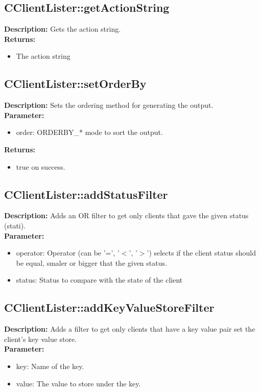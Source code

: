 \subsection{CClientLister::getActionString}
\textbf{Description:} Gets the action string.\\
\textbf{Returns:}
\begin{itemize}
\item The action string
\end{itemize}

\subsection{CClientLister::setOrderBy}
\textbf{Description:} Sets the ordering method for generating the output.\\
\textbf{Parameter:}
\begin{itemize}
\item order: ORDERBY\_* mode to sort the output.
\end{itemize}
\textbf{Returns:}
\begin{itemize}
\item true on success.
\end{itemize}

\subsection{CClientLister::addStatusFilter}
\textbf{Description:} Adds an OR filter to get only clients that gave the given status (stati).\\
\textbf{Parameter:}
\begin{itemize}
\item operator: Operator (can be '=', '$<$', '$>$') selects if the client status should be equal, smaler or bigger that the given status.
\item status: Status to compare with the state of the client
\end{itemize}

\subsection{CClientLister::addKeyValueStoreFilter}
\textbf{Description:} Adds a filter to get only clients that have a key value pair set the client's key value store.\\
\textbf{Parameter:}
\begin{itemize}
\item key: Name of the key.
\item value: The value to store under the key.
\end{itemize}

